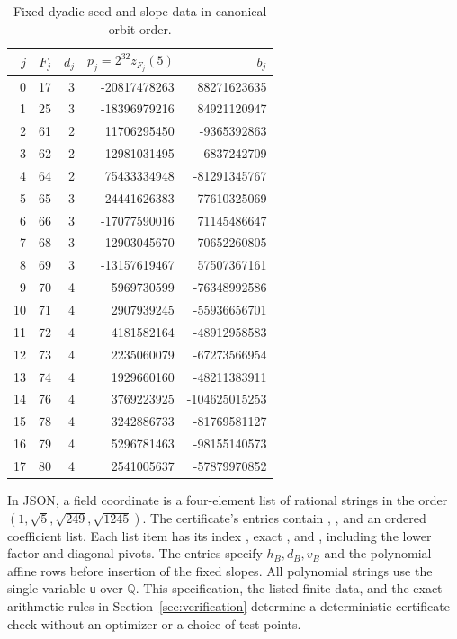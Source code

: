 \documentclass[11pt]{article}
\newcommand{\Q}{\mathbb Q}
\begin{document}
\begin{table}[ht]
\centering\small
\begin{tabular}{r r r r r}
\toprule
$j$&$F_j$&$d_j$&$p_j=2^{32}z_{F_j}(5)$&$b_j$\\\midrule
0&17&3&-20817478263&88271623635\\
1&25&3&-18396979216&84921120947\\
2&61&2&11706295450&-9365392863\\
3&62&2&12981031495&-6837242709\\
4&64&2&75433334948&-81291345767\\
5&65&3&-24441626383&77610325069\\
6&66&3&-17077590016&71145486647\\
7&68&3&-12903045670&70652260805\\
8&69&3&-13157619467&57507367161\\
9&70&4&5969730599&-76348992586\\
10&71&4&2907939245&-55936656701\\
11&72&4&4181582164&-48912958583\\
12&73&4&2235060079&-67273566954\\
13&74&4&1929660160&-48211383911\\
14&76&4&3769223925&-104625015253\\
15&78&4&3242886733&-81769581127\\
16&79&4&5296781463&-98155140573\\
17&80&4&2541005637&-57879970852\\\bottomrule
\end{tabular}
\caption{Fixed dyadic seed and slope data in canonical orbit order.}\label{tab:free}
\end{table}

In JSON, a field coordinate is a four-element list of rational strings
in the order $(1,\sqrt5,\sqrt{249},\sqrt{1245})$.
The certificate's  entries contain
, , and an ordered coefficient list.
Each list item has its index , exact , and
, including the lower factor and diagonal pivots.
The  entries specify $h_B,d_B,v_B$
and the polynomial affine rows before insertion of the fixed slopes.
All polynomial strings use the single variable \texttt{u} over $\Q$.
This specification, the listed finite data, and the exact arithmetic
rules in Section~\ref{sec:verification} determine a deterministic
certificate check without an optimizer or a choice of test points.
\end{document}
